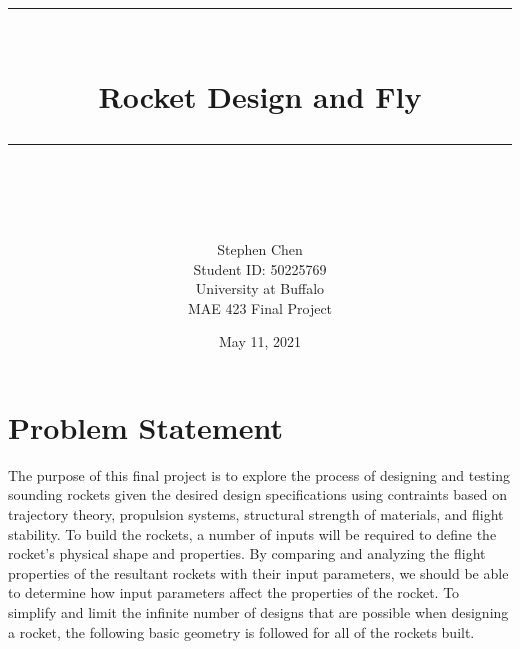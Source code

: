 \documentclass{report}
\newcommand{\HRule}[1]{\rule{\linewidth}{#1}}
\begin{document}
\title{ \normalsize \textsc{ }
		\\ [2.0cm]
		\HRule{1pt} \\
		\LARGE \textbf{Rocket Design and Fly}
		\HRule{1pt} \\ [0.5cm]
		\normalsize  \vspace*{5\baselineskip}}



\author{Stephen Chen \\
	Student ID: 50225769 \\ 
	University at Buffalo \\
	MAE 423 Final Project \\
}
        
        
\date {May 11, 2021}


\maketitle
\tableofcontents
\newpage

\sectionfont{\scshape}


\section*{Problem Statement}

The purpose of this final project is to explore the process of designing and testing sounding rockets given the desired design specifications using contraints based on trajectory theory, propulsion systems, structural strength of materials, and flight stability.
To build the rockets, a number of inputs will be required to define the rocket's physical shape and properties.
By comparing and analyzing the flight properties of the resultant rockets with their input parameters, we should be able to determine how input parameters affect the properties of the rocket.
To simplify and limit the infinite number of designs that are possible when designing a rocket, the following basic geometry is followed for all of the rockets built.
\end{document}
